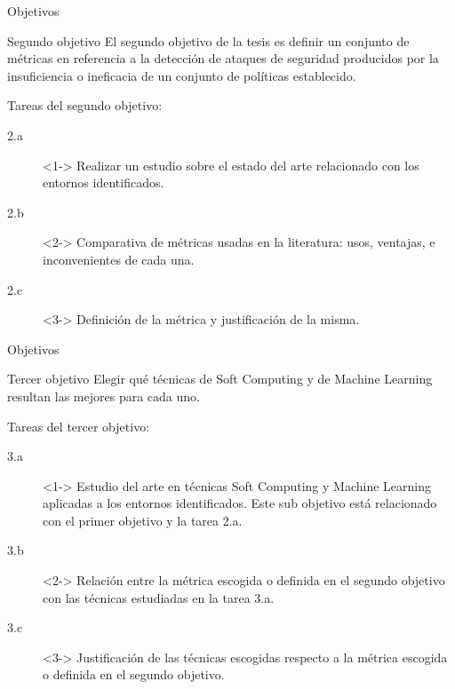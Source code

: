 \documentclass{beamer}
\begin{document}
\begin{frame}{Objetivos}

\begin{block}{Segundo objetivo}
El segundo objetivo de la tesis es definir un conjunto de métricas en referencia a la detección de ataques de seguridad producidos por la insuficiencia o ineficacia de un conjunto de políticas establecido.
\end{block}

Tareas del segundo objetivo:

\begin{description}
  \item[2.a]<1-> Realizar un estudio sobre el estado del arte
    relacionado con los entornos identificados. 
  \item[2.b]<2-> Comparativa de métricas usadas en la literatura: usos, ventajas, e inconvenientes de cada una.
  \item[2.c]<3-> Definición de la métrica y justificación de la misma.
\end{description}

\end{frame}

\begin{frame}{Objetivos}

\begin{block}{Tercer objetivo}
Elegir qué técnicas de Soft Computing y de Machine Learning resultan las mejores para cada uno.
\end{block}

Tareas del tercer objetivo:

\begin{small}
\begin{description}
  \item[3.a]<1-> Estudio del arte en técnicas Soft Computing y Machine Learning aplicadas a los entornos identificados. Este sub objetivo está relacionado con el primer objetivo y la tarea 2.a.
  \item[3.b]<2-> Relación entre la métrica escogida o definida en el segundo objetivo con las técnicas estudiadas en la tarea 3.a.
  \item[3.c]<3-> Justificación de las técnicas escogidas respecto a la métrica escogida o definida en el segundo objetivo.
\end{description}
\end{small}

\end{frame}
\end{document}
